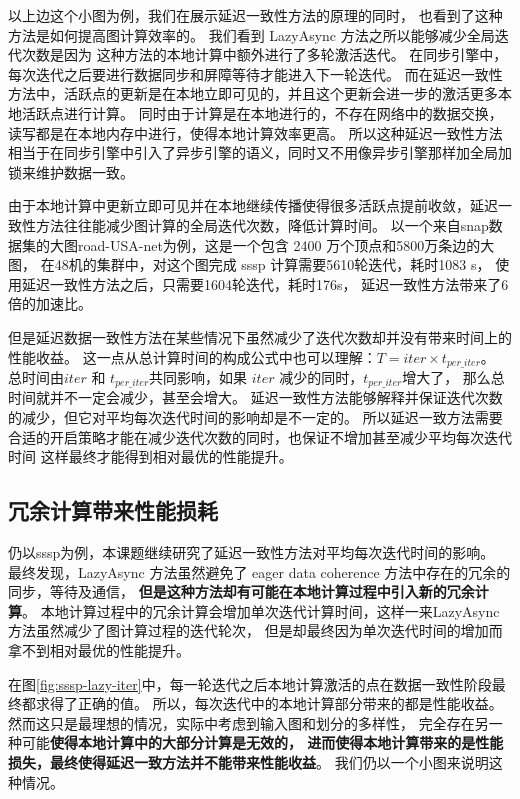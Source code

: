 以上边这个小图为例，我们在展示延迟一致性方法的原理的同时，
也看到了这种方法是如何提高图计算效率的。
我们看到 LazyAsync 方法之所以能够减少全局迭代次数是因为
这种方法的本地计算中额外进行了多轮激活迭代。
在同步引擎中，每次迭代之后要进行数据同步和屏障等待才能进入下一轮迭代。
而在延迟一致性方法中，活跃点的更新是在本地立即可见的，并且这个更新会进一步的激活更多本地活跃点进行计算。
同时由于计算是在本地进行的，不存在网络中的数据交换，读写都是在本地内存中进行，使得本地计算效率更高。
所以这种延迟一致性方法相当于在同步引擎中引入了异步引擎的语义\cite{Ju@MACS17}，同时又不用像异步引擎那样加全局加锁来维护数据一致\cite{Xie@PPoPP15}。

由于本地计算中更新立即可见并在本地继续传播使得很多活跃点提前收敛，延迟一致性方法往往能减少图计算的全局迭代次数，降低计算时间。
以一个来自snap\cite{SNAP}数据集的大图road-USA-net为例，这是一个包含 2400 万个顶点和5800万条边的大图，
在48机的集群中，对这个图完成 sssp 计算需要5610轮迭代，耗时1083 s， 使用延迟一致性方法之后，只需要1604轮迭代，耗时176s，
延迟一致性方法带来了6倍的加速比。

但是延迟数据一致性方法在某些情况下虽然减少了迭代次数却并没有带来时间上的性能收益。
这一点从总计算时间的构成公式\cite{bsp@1990}中也可以理解：$T=iter \times t_{per\_iter}$。
总时间由$iter$ 和 $t_{per\_iter}$共同影响，如果 $iter$ 减少的同时，$t_{per\_iter}$增大了，
那么总时间就并不一定会减少，甚至会增大。
延迟一致性方法能够解释并保证迭代次数的减少，但它对平均每次迭代时间的影响却是不一定的。
所以延迟一致方法需要合适的开启策略才能在减少迭代次数的同时，也保证不增加甚至减少平均每次迭代时间
这样最终才能得到相对最优的性能提升。

\subsection{冗余计算带来性能损耗}
仍以sssp为例，本课题继续研究了延迟一致性方法对平均每次迭代时间的影响。
最终发现，LazyAsync 方法虽然避免了 eager data coherence 方法中存在的冗余的同步，等待及通信，
\textbf{但是这种方法却有可能在本地计算过程中引入新的冗余计算}。
本地计算过程中的冗余计算会增加单次迭代计算时间，这样一来LazyAsync方法虽然减少了图计算过程的迭代轮次，
但是却最终因为单次迭代时间的增加而拿不到相对最优的性能提升。


在图\ref{fig:sssp-lazy-iter}中，每一轮迭代之后本地计算激活的点在数据一致性阶段最终都求得了正确的值。
所以，每次迭代中的本地计算部分带来的都是性能收益。
然而这只是最理想的情况，实际中考虑到输入图和划分的多样性，
完全存在另一种可能\textbf{使得本地计算中的大部分计算是无效的，
进而使得本地计算带来的是性能损失，最终使得延迟一致方法并不能带来性能收益}。
我们仍以一个小图来说明这种情况。


